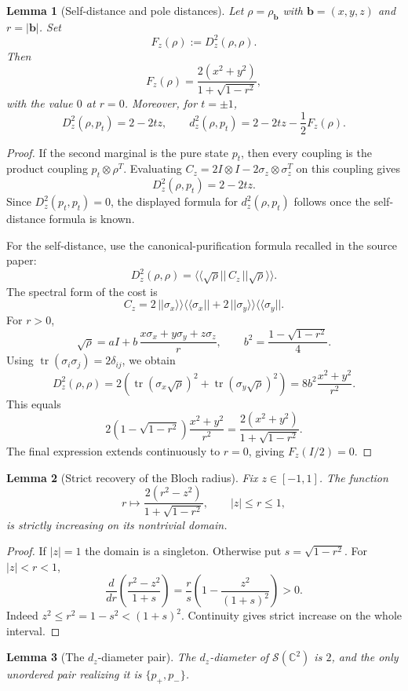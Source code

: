 \documentclass[11pt]{amsart}
\newtheorem{lemma}{Lemma}
\newcommand{\C}{\mathbb C}
\newcommand{\cS}{\mathcal S}
\newcommand{\tr}{\operatorname{tr}}
\newcommand{\Id}{I}
\newcommand{\sigx}{\sigma_x}
\newcommand{\sigy}{\sigma_y}
\newcommand{\sigz}{\sigma_z}
\newcommand{\bb}{\mathbf b}
\newcommand{\ketket}[1]{|\!|#1\rangle\!\rangle}
\newcommand{\brabra}[1]{\langle\!\langle #1|\!|}
\begin{document}
\begin{lemma}[Self-distance and pole distances]\label{lem:formulas}
Let \(\rho=\rho_{\bb}\) with \(\bb=(x,y,z)\) and \(r=|\bb|\).  Set
\[
  F_z(\rho):=D_z^2(\rho,\rho).
\]
Then
\[
  F_z(\rho)=\frac{2(x^2+y^2)}{1+\sqrt{1-r^2}},
\]
with the value \(0\) at \(r=0\).  Moreover, for \(t=\pm1\),
\[
  D_z^2(\rho,p_t)=2-2tz,
  \qquad
  d_z^2(\rho,p_t)=2-2tz-\frac12F_z(\rho).
\]
\end{lemma}

\begin{proof}
If the second marginal is the pure state \(p_t\), then every coupling is the
product coupling \(p_t\otimes \rho^T\).  Evaluating \(C_z=2\Id\otimes\Id
-2\sigz\otimes\sigz^T\) on this coupling gives
\[
  D_z^2(\rho,p_t)=2-2tz.
\]
Since \(D_z^2(p_t,p_t)=0\), the displayed formula for \(d_z^2(\rho,p_t)\)
follows once the self-distance formula is known.

For the self-distance, use the canonical-purification formula recalled in the
source paper:
\[
  D_z^2(\rho,\rho)=\brabra{\sqrt\rho}\, C_z\,\ketket{\sqrt\rho}.
\]
The spectral form of the cost is
\[
  C_z=2\,\ketket{\sigx}\brabra{\sigx}
      +2\,\ketket{\sigy}\brabra{\sigy}.
\]
For \(r>0\),
\[
  \sqrt{\rho}
  =a\Id+b\,\frac{x\sigx+y\sigy+z\sigz}{r},
  \qquad
  b^2=\frac{1-\sqrt{1-r^2}}4.
\]
Using \(\tr(\sigma_i\sigma_j)=2\delta_{ij}\), we obtain
\[
  D_z^2(\rho,\rho)
  =2\left(\tr(\sigx\sqrt\rho)^2+\tr(\sigy\sqrt\rho)^2\right)
  =8b^2\frac{x^2+y^2}{r^2}.
\]
This equals
\[
  2\left(1-\sqrt{1-r^2}\right)\frac{x^2+y^2}{r^2}
  =\frac{2(x^2+y^2)}{1+\sqrt{1-r^2}}.
\]
The final expression extends continuously to \(r=0\), giving \(F_z(\Id/2)=0\).
\end{proof}

\begin{lemma}[Strict recovery of the Bloch radius]\label{lem:mono}
Fix \(z\in[-1,1]\).  The function
\[
  r\longmapsto \frac{2(r^2-z^2)}{1+\sqrt{1-r^2}},
  \qquad |z|\leq r\leq 1,
\]
is strictly increasing on its nontrivial domain.
\end{lemma}

\begin{proof}
If \(|z|=1\) the domain is a singleton.  Otherwise put \(s=\sqrt{1-r^2}\).
For \(|z|<r<1\),
\[
  \frac{d}{dr}\left(\frac{r^2-z^2}{1+s}\right)
  =\frac{r}{s}\left(1-\frac{z^2}{(1+s)^2}\right)>0.
\]
Indeed \(z^2\leq r^2=1-s^2<(1+s)^2\).  Continuity gives strict increase on
the whole interval.
\end{proof}

\begin{lemma}[The \(d_z\)-diameter pair]\label{lem:diameter}
The \(d_z\)-diameter of \(\cS(\C^2)\) is \(2\), and the only unordered pair
realizing it is \(\{p_+,p_-\}\).
\end{lemma}
\end{document}
